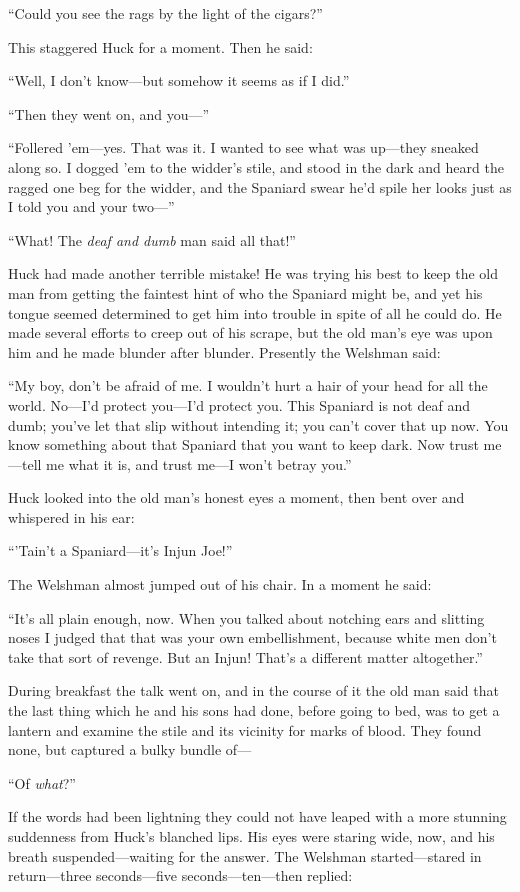 \documentclass{book}
\begin{document}
“Could you see the rags by the light of the cigars?”

This staggered Huck for a moment. Then he said:

“Well, I don’t know—but somehow it seems as if I did.”

“Then they went on, and you—”

“Follered ’em—yes. That was it. I wanted to see what was up—they sneaked along so. I dogged ’em to the widder’s stile, and stood in the dark and heard the ragged one beg for the widder, and the Spaniard swear he’d spile her looks just as I told you and your two—”

“What! The \emph{deaf and dumb} man said all that!”

Huck had made another terrible mistake! He was trying his best to keep the old man from getting the faintest hint of who the Spaniard might be, and yet his tongue seemed determined to get him into trouble in spite of all he could do. He made several efforts to creep out of his scrape, but the old man’s eye was upon him and he made blunder after blunder. Presently the Welshman said:

“My boy, don’t be afraid of me. I wouldn’t hurt a hair of your head for all the world. No—I’d protect you—I’d protect you. This Spaniard is not deaf and dumb; you’ve let that slip without intending it; you can’t cover that up now. You know something about that Spaniard that you want to keep dark. Now trust me—tell me what it is, and trust me—I won’t betray you.”

Huck looked into the old man’s honest eyes a moment, then bent over and whispered in his ear:

“’Tain’t a Spaniard—it’s Injun Joe!”

The Welshman almost jumped out of his chair. In a moment he said:

“It’s all plain enough, now. When you talked about notching ears and slitting noses I judged that that was your own embellishment, because white men don’t take that sort of revenge. But an Injun! That’s a different matter altogether.”

During breakfast the talk went on, and in the course of it the old man said that the last thing which he and his sons had done, before going to bed, was to get a lantern and examine the stile and its vicinity for marks of blood. They found none, but captured a bulky bundle of—

“Of \emph{what}?”

If the words had been lightning they could not have leaped with a more stunning suddenness from Huck’s blanched lips. His eyes were staring wide, now, and his breath suspended—waiting for the answer. The Welshman started—stared in return—three seconds—five seconds—ten—then replied:
\end{document}
